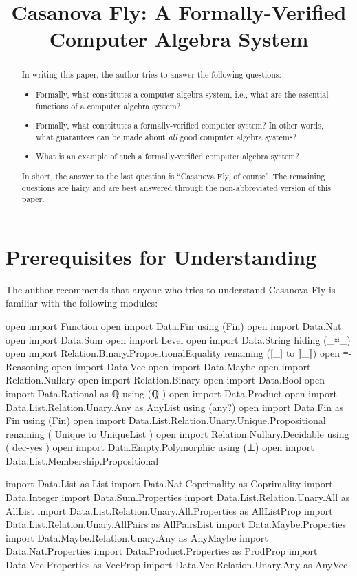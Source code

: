 \documentclass{report}
\title{Casanova Fly: A Formally-Verified Computer Algebra System}
\begin{document}
\maketitle{}

\begin{abstract}
In writing this paper, the author tries to answer the following questions:

\begin{itemize}
  \item Formally, what constitutes a computer algebra system, i.e., what are the essential functions of a computer algebra system?
  \item Formally, what constitutes a formally-verified computer system?  In other words, what guarantees can be made about \emph{all} good computer algebra systems?
  \item What is an example of such a formally-verified computer algebra system?
\end{itemize}

In short, the answer to the last question is ``Casanova Fly, of course''.  The remaining questions are hairy and are best answered through the non-abbreviated version of this paper.
\end{abstract}

\chapter{Prerequisites for Understanding}
The author recommends that anyone who tries to understand Casanova Fly is familiar with the following modules:

\begin{code}
open import Function
open import Data.Fin using (Fin)
open import Data.Nat
open import Data.Sum
open import Level
open import Data.String hiding (_≈_)
open import Relation.Binary.PropositionalEquality renaming ([_] to ⟦_⟧)
open ≡-Reasoning
open import Data.Vec
open import Data.Maybe
open import Relation.Nullary
open import Relation.Binary
open import Data.Bool
open import Data.Rational
  as ℚ
  using (ℚ
        )
open import Data.Product
open import Data.List.Relation.Unary.Any as AnyList using (any?)
open import Data.Fin as Fin using (Fin)
open import Data.List.Relation.Unary.Unique.Propositional
  renaming
    ( Unique to UniqueList
    )
open import Relation.Nullary.Decidable
  using
    ( dec-yes
    )
open import Data.Empty.Polymorphic using (⊥)
open import Data.List.Membership.Propositional

import Data.List as List
import Data.Nat.Coprimality as Coprimality
import Data.Integer
import Data.Sum.Properties
import Data.List.Relation.Unary.All as AllList
import Data.List.Relation.Unary.All.Properties as AllListProp
import Data.List.Relation.Unary.AllPairs as AllPairsList
import Data.Maybe.Properties
import Data.Maybe.Relation.Unary.Any as AnyMaybe
import Data.Nat.Properties
import Data.Product.Properties as ProdProp
import Data.Vec.Properties as VecProp
import Data.Vec.Relation.Unary.Any as AnyVec
\end{code}
\end{document}
